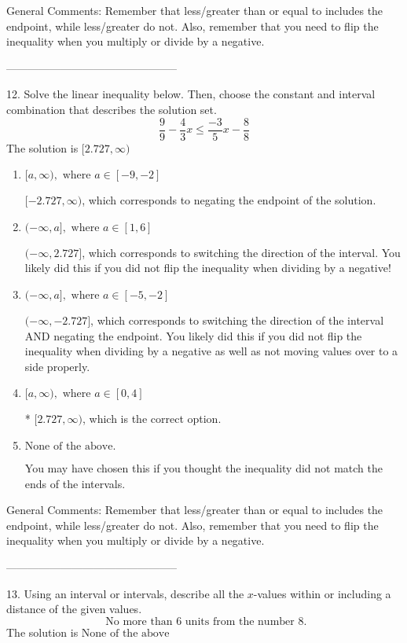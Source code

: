 \documentclass{article}[14pt]
\begin{document}
General Comments: Remember that less/greater than or equal to includes the endpoint, while less/greater do not. Also, remember that you need to flip the inequality when you multiply or divide by a negative.

-----------------------------------------------

12. Solve the linear inequality below. Then, choose the constant and interval combination that describes the solution set.
$$ \frac{9}{9} - \frac{4}{3} x \leq \frac{-3}{5} x - \frac{8}{8} $$ 
The solution is $ [2.727, \infty) $ 

\begin{enumerate}[label=\Alph*.] 
\item $ [a, \infty), \text{ where } a \in [-9, -2] $ 

  $[-2.727, \infty)$, which corresponds to negating the endpoint of the solution. 
\item $ (-\infty, a], \text{ where } a \in [1, 6] $ 

  $(-\infty, 2.727]$, which corresponds to switching the direction of the interval. You likely did this if you did not flip the inequality when dividing by a negative! 
\item $ (-\infty, a], \text{ where } a \in [-5, -2] $ 

  $(-\infty, -2.727]$, which corresponds to switching the direction of the interval AND negating the endpoint. You likely did this if you did not flip the inequality when dividing by a negative as well as not moving values over to a side properly. 
\item $ [a, \infty), \text{ where } a \in [0, 4] $ 

 * $[2.727, \infty)$, which is the correct option. 
\item $ \text{None of the above}. $ 

 You may have chosen this if you thought the inequality did not match the ends of the intervals. 
\end{enumerate} 
 
General Comments: Remember that less/greater than or equal to includes the endpoint, while less/greater do not. Also, remember that you need to flip the inequality when you multiply or divide by a negative.

-----------------------------------------------

13. Using an interval or intervals, describe all the $x$-values within or including a distance of the given values.
$$ \text{ No more than } 6 \text{ units from the number } 8. $$ 
The solution is $ \text{None of the above} $ 
\end{document}
